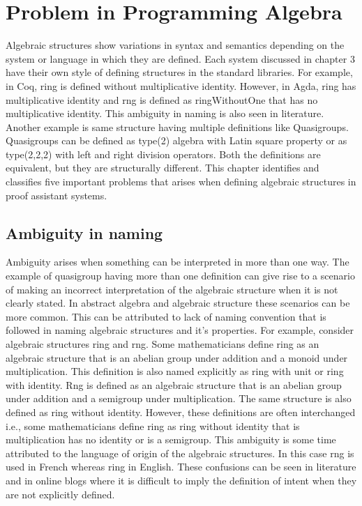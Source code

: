 \chapter{Problem in Programming Algebra}

Algebraic structures show variations in syntax and semantics depending on the
system or language in which they are defined. Each system discussed in chapter
3 have their own style of defining structures in the standard libraries. For
example, in Coq, ring is defined without multiplicative identity. However, in
Agda, ring has multiplicative identity and rng is defined as ringWithoutOne that
has no multiplicative identity. This ambiguity in naming is also seen in
literature. Another example is same structure having multiple definitions like
Quasigroups. Quasigroups can be defined as type(2) algebra with Latin square
property or as type(2,2,2) with left and right division operators. Both the
definitions are equivalent, but they are structurally different. This chapter
identifies and classifies five important problems that arises when defining
algebraic structures in proof assistant systems. 

\section{Ambiguity in naming}
Ambiguity arises when something can be interpreted in more than one way. The
example of quasigroup having more than one definition can give rise to a
scenario of making an incorrect interpretation of the algebraic structure when
it is not clearly stated. In abstract algebra and algebraic structure these
scenarios can be more common. This can be attributed to lack of naming
convention that is followed in naming algebraic structures and it's properties.
For example, consider algebraic structures ring and rng. Some mathematicians
define ring as an algebraic structure that is an abelian group under addition
and a monoid under multiplication. This definition is also named explicitly as
ring with unit or ring with identity. Rng is defined as an algebraic structure
that is an abelian group under addition and a semigroup under multiplication.
The same structure is also defined as ring without identity. However, these
definitions are often interchanged i.e., some mathematicians define ring as ring
without identity that is multiplication has no identity or is a semigroup. This
ambiguity is some time attributed to the language of origin of the algebraic
structures. In this case rng is used in French whereas ring in English. These
confusions can be seen in literature and in online blogs where it is difficult
to imply the definition of intent when they are not explicitly defined. 

